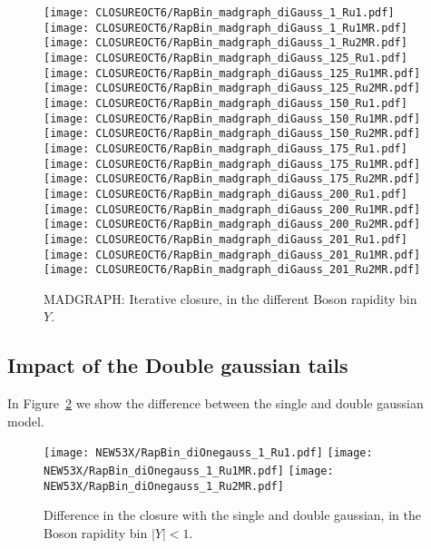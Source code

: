 \documentclass[41pt,a4paper,oneside]{report}
\begin{document}
\begin{figure}[h!]
  \begin{center}
    \texttt{[image: CLOSUREOCT6/RapBin\_madgraph\_diGauss\_1\_Ru1.pdf]}
    \texttt{[image: CLOSUREOCT6/RapBin\_madgraph\_diGauss\_1\_Ru1MR.pdf]}
    \texttt{[image: CLOSUREOCT6/RapBin\_madgraph\_diGauss\_1\_Ru2MR.pdf]}
    \texttt{[image: CLOSUREOCT6/RapBin\_madgraph\_diGauss\_125\_Ru1.pdf]}
    \texttt{[image: CLOSUREOCT6/RapBin\_madgraph\_diGauss\_125\_Ru1MR.pdf]}
    \texttt{[image: CLOSUREOCT6/RapBin\_madgraph\_diGauss\_125\_Ru2MR.pdf]}
    \texttt{[image: CLOSUREOCT6/RapBin\_madgraph\_diGauss\_150\_Ru1.pdf]}
    \texttt{[image: CLOSUREOCT6/RapBin\_madgraph\_diGauss\_150\_Ru1MR.pdf]}
    \texttt{[image: CLOSUREOCT6/RapBin\_madgraph\_diGauss\_150\_Ru2MR.pdf]}
    \texttt{[image: CLOSUREOCT6/RapBin\_madgraph\_diGauss\_175\_Ru1.pdf]}
    \texttt{[image: CLOSUREOCT6/RapBin\_madgraph\_diGauss\_175\_Ru1MR.pdf]}
    \texttt{[image: CLOSUREOCT6/RapBin\_madgraph\_diGauss\_175\_Ru2MR.pdf]}
    \texttt{[image: CLOSUREOCT6/RapBin\_madgraph\_diGauss\_200\_Ru1.pdf]}
    \texttt{[image: CLOSUREOCT6/RapBin\_madgraph\_diGauss\_200\_Ru1MR.pdf]}
    \texttt{[image: CLOSUREOCT6/RapBin\_madgraph\_diGauss\_200\_Ru2MR.pdf]}
    \texttt{[image: CLOSUREOCT6/RapBin\_madgraph\_diGauss\_201\_Ru1.pdf]}
    \texttt{[image: CLOSUREOCT6/RapBin\_madgraph\_diGauss\_201\_Ru1MR.pdf]}
    \texttt{[image: CLOSUREOCT6/RapBin\_madgraph\_diGauss\_201\_Ru2MR.pdf]}
    \caption{MADGRAPH: Iterative closure, in the different Boson rapidity bin $Y$. }
    \label{fig:iterClosureMAD}
  \end{center}
\end{figure}


\subsection{Impact of the Double gaussian tails}
\label{sec:DoubleGaussValid}
In Figure~\ref{fig:OneTwoGauss} we show the difference between the single and double gaussian model.
{\color{magenta}{Need to add the plot wih the impact on the MT and MET tails}}
\begin{figure}[h!]
  \begin{center}
    \texttt{[image: NEW53X/RapBin\_diOnegauss\_1\_Ru1.pdf]}
    \texttt{[image: NEW53X/RapBin\_diOnegauss\_1\_Ru1MR.pdf]}
    \texttt{[image: NEW53X/RapBin\_diOnegauss\_1\_Ru2MR.pdf]}
    \caption{Difference in the closure with the single and double gaussian, in the Boson rapidity bin $|Y|<1$. {\color{blue}{plot 4th raw oder than OCT6}}}
    \label{fig:OneTwoGauss}
  \end{center}
\end{figure}
\end{document}
